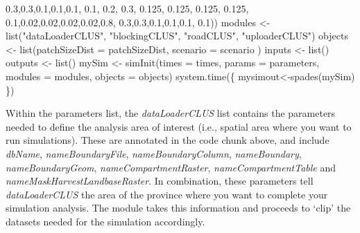 \documentclass[
]{article}
\newenvironment{Shaded}{\begin{snugshade}}{\end{snugshade}}
\newcommand{\AttributeTok}[1]{\textcolor[rgb]{0.77,0.63,0.00}{#1}}
\newcommand{\FloatTok}[1]{\textcolor[rgb]{0.00,0.00,0.81}{#1}}
\newcommand{\FunctionTok}[1]{\textcolor[rgb]{0.00,0.00,0.00}{#1}}
\newcommand{\NormalTok}[1]{#1}
\newcommand{\OtherTok}[1]{\textcolor[rgb]{0.56,0.35,0.01}{#1}}
\newcommand{\StringTok}[1]{\textcolor[rgb]{0.31,0.60,0.02}{#1}}
\begin{document}
\begin{Shaded}
\begin{Highlighting}[]
                                    \FloatTok{0.3}\NormalTok{,}\FloatTok{0.3}\NormalTok{,}\FloatTok{0.1}\NormalTok{,}\FloatTok{0.1}\NormalTok{,}\FloatTok{0.1}\NormalTok{, }\FloatTok{0.1}\NormalTok{,}
                                    \FloatTok{0.2}\NormalTok{, }\FloatTok{0.3}\NormalTok{, }\FloatTok{0.125}\NormalTok{, }\FloatTok{0.125}\NormalTok{, }\FloatTok{0.125}\NormalTok{, }\FloatTok{0.125}\NormalTok{,}
                                    \FloatTok{0.1}\NormalTok{,}\FloatTok{0.02}\NormalTok{,}\FloatTok{0.02}\NormalTok{,}\FloatTok{0.02}\NormalTok{,}\FloatTok{0.02}\NormalTok{,}\FloatTok{0.8}\NormalTok{,}
                                    \FloatTok{0.3}\NormalTok{,}\FloatTok{0.3}\NormalTok{,}\FloatTok{0.1}\NormalTok{,}\FloatTok{0.1}\NormalTok{,}\FloatTok{0.1}\NormalTok{, }\FloatTok{0.1}\NormalTok{))}
\NormalTok{modules }\OtherTok{\textless{}{-}} \FunctionTok{list}\NormalTok{(}\StringTok{"dataLoaderCLUS"}\NormalTok{, }
                \StringTok{"blockingCLUS"}\NormalTok{,}
                \StringTok{"roadCLUS"}\NormalTok{,}
                \StringTok{"uploaderCLUS"}\NormalTok{)}
\NormalTok{objects }\OtherTok{\textless{}{-}} \FunctionTok{list}\NormalTok{(}\AttributeTok{patchSizeDist =}\NormalTok{ patchSizeDist, }
                \AttributeTok{scenario =}\NormalTok{ scenario}
\NormalTok{                )}
\NormalTok{inputs }\OtherTok{\textless{}{-}} \FunctionTok{list}\NormalTok{()}
\NormalTok{outputs }\OtherTok{\textless{}{-}} \FunctionTok{list}\NormalTok{()}
\NormalTok{mySim }\OtherTok{\textless{}{-}} \FunctionTok{simInit}\NormalTok{(}\AttributeTok{times =}\NormalTok{ times, }
                 \AttributeTok{params =}\NormalTok{ parameters, }
                 \AttributeTok{modules =}\NormalTok{ modules,}
                 \AttributeTok{objects =}\NormalTok{ objects)}
\FunctionTok{system.time}\NormalTok{(\{}
\NormalTok{mysimout}\OtherTok{\textless{}{-}}\FunctionTok{spades}\NormalTok{(mySim)}
\NormalTok{\})}
\end{Highlighting}
\end{Shaded}

Within the parameters list, the \emph{dataLoaderCLUS} list contains the
parameters needed to define the analysis area of interest (i.e., spatial
area where you want to run simulations). These are annotated in the code
chunk above, and include \emph{dbName}, \emph{nameBoundaryFile},
\emph{nameBoundaryColumn}, \emph{nameBoundary}, \emph{nameBoundaryGeom},
\emph{nameCompartmentRaster}, \emph{nameCompartmentTable} and
\emph{nameMaskHarvestLandbaseRaster}. In combination, these parameters
tell \emph{dataLoaderCLUS} the area of the province where you want to
complete your simulation analysis. The module takes this information and
proceeds to `clip' the datasets needed for the simulation accordingly.
\end{document}
